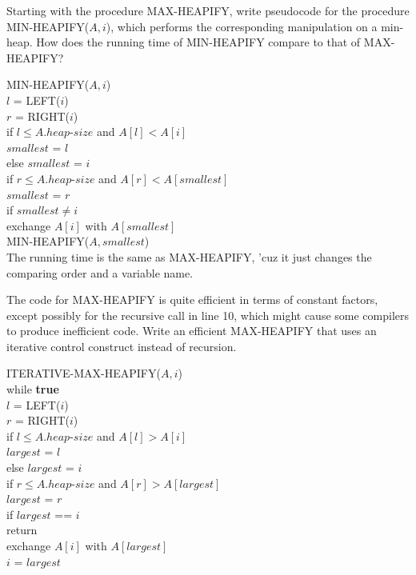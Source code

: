 \documentclass[12pt, a4paper, UTF8]{ctexart}
\begin{document}
\begin{problem}[TC: 6.2-2]
  Starting with the procedure MAX-HEAPIFY, write pseudocode for the 
  procedure MIN-HEAPIFY($A,i$), which performs the corresponding 
  manipulation on a min-heap. How does the running time of MIN-HEAPIFY 
  compare to that of MAX-HEAPIFY?
\end{problem}

\begin{solution}
  MIN-HEAPIFY($A,i$)\\
  \indent $l$ = LEFT($i$)\\
  \indent $r$ = RIGHT($i$)\\
  \indent if $l\leq A.heap$-$size$ and $A[l] < A[i]$\\
  \indent\indent $smallest$ = $l$\\
  \indent else $smallest$ = $i$\\
  \indent if $r\leq A.heap$-$size$ and $A[r] < A[smallest]$\\
  \indent\indent $smallest$ = $r$\\
  \indent if $smallest\neq i$\\
  \indent\indent exchange $A[i]$ with $A[smallest]$\\
  \indent\indent MIN-HEAPIFY($A,smallest$)\\
  The running time is the same as MAX-HEAPIFY, 'cuz it just changes the 
  comparing order and a variable name.
\end{solution}

\begin{problem}[TC: 6.2-5]
  The code for MAX-HEAPIFY is quite efficient in terms of constant 
  factors, except possibly for the recursive call in line 10, which 
  might cause some compilers to produce inefficient code. Write an 
  efficient MAX-HEAPIFY that uses an iterative control construct 
  instead of recursion.
\end{problem}

\begin{solution}
  ITERATIVE-MAX-HEAPIFY($A,i$)\\
  \indent while \textbf{true}\\
  \indent\indent $l$ = LEFT($i$)\\
  \indent\indent $r$ = RIGHT($i$)\\
  \indent\indent if $l\leq A.heap$-$size$ and $A[l] > A[i]$\\
  \indent\indent\indent $largest$ = $l$\\
  \indent\indent else $largest$ = $i$\\
  \indent\indent if $r\leq A.heap$-$size$ and $A[r] > A[largest]$\\
  \indent\indent\indent $largest$ = $r$\\
  \indent\indent if $largest$ == $i$\\
  \indent\indent\indent return\\
  \indent\indent exchange $A[i]$ with $A[largest]$\\
  \indent\indent $i$ = $largest$
\end{solution}
\end{document}
